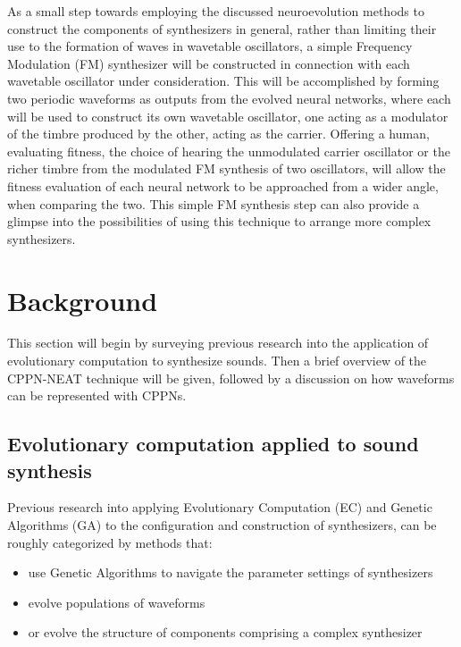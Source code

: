 \documentclass[conference]{IEEEtran}
\begin{document}
As a small step towards employing the discussed neuroevolution methods to construct the components of synthesizers in general, rather than limiting their use to the formation of waves in wavetable oscillators, a simple Frequency Modulation (FM) \cite{chowning1977synthesis} synthesizer will be constructed in connection with each wavetable oscillator under consideration.  This will be accomplished by forming two periodic waveforms as outputs from the evolved neural networks, where each will be used to construct its own wavetable oscillator, one acting as a modulator of the timbre produced by the other, acting as the carrier.  Offering a human, evaluating fitness, the choice of hearing the unmodulated carrier oscillator or the richer timbre from the modulated FM synthesis of two oscillators, will allow the fitness evaluation of each neural network to be approached from a wider angle, when comparing the two.  This simple FM synthesis step can also provide a glimpse into the possibilities of using this technique to arrange more complex synthesizers.



\section{Background}

This section will begin by surveying previous research into the application of evolutionary computation to synthesize sounds.  Then a brief overview of the CPPN-NEAT technique will be given, followed by a discussion on how waveforms can be represented with CPPNs.


\subsection{Evolutionary computation applied to sound synthesis}

Previous research into applying Evolutionary Computation (EC) and Genetic Algorithms (GA) to the configuration and construction of synthesizers, can be roughly categorized by methods that:

\begin{itemize}
	\item use Genetic Algorithms to navigate the parameter settings of synthesizers
	\item evolve populations of waveforms
	\item or evolve the structure of components comprising a complex synthesizer
\end{itemize}
\end{document}
